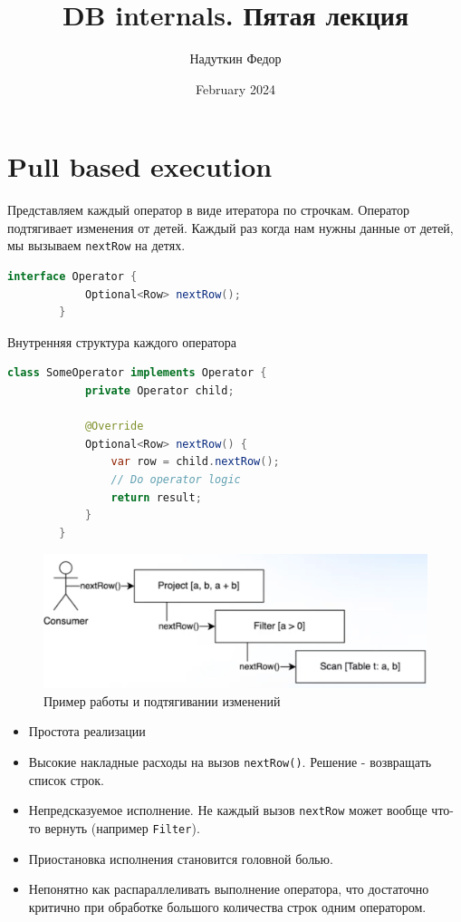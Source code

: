 \documentclass[11pt]{article}
\title{DB internals. Пятая
лекция}
\author{Надуткин Федор }
\date{February 2024}
\begin{document}
    \maketitle
    \newpage

    \section{Pull based execution}

    Представляем каждый оператор в виде итератора по строчкам.
    Оператор подтягивает изменения от детей.
    Каждый раз когда нам нужны данные от детей, мы вызываем \texttt{nextRow} на детях.

    \begin{lstlisting}[language=Java]
        interface Operator {
            Optional<Row> nextRow();
        }
    \end{lstlisting}

    Внутренняя структура каждого оператора

    \begin{lstlisting}[language=Java]
        class SomeOperator implements Operator {
            private Operator child;

            @Override
            Optional<Row> nextRow() {
                var row = child.nextRow();
                // Do operator logic
                return result;
            }
        }
    \end{lstlisting}

    \begin{figure}[h!]
        \centering
        \includegraphics[width=\textwidth]{Pictures/Pull/Consumer pulls}
        \caption{Пример работы и подтягивании изменений}
    \end{figure}

    \begin{itemize}[label=+]
        \item Простота реализации
    \end{itemize}
    \begin{itemize}[label=-]
        \item Высокие накладные расходы на вызов \texttt{nextRow()}.
        Решение - возвращать список строк.
        \item Непредсказуемое исполнение.
        Не каждый вызов \texttt{nextRow} может вообще что-то вернуть (например \texttt{Filter}).
        \item Приостановка исполнения становится головной болью.
        \item Непонятно как распараллеливать выполнение оператора, что достаточно критично при обработке большого количества строк одним оператором.
    \end{itemize}
\end{document}

